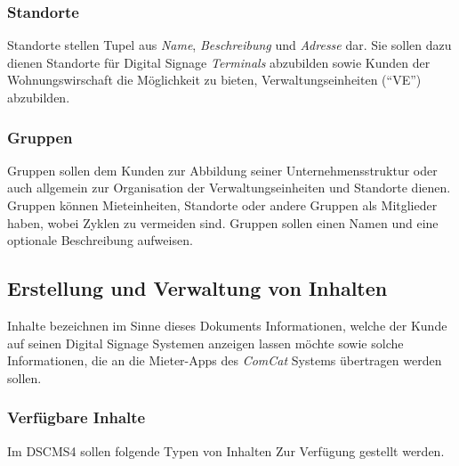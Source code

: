 \documentclass[a4paper]{article}
\begin{document}
	\subsubsection{Standorte}
	Standorte stellen Tupel aus \emph{Name}, \emph{Beschreibung} und \emph{Adresse} dar. Sie sollen dazu dienen Standorte für Digital Signage \emph{Terminals} abzubilden sowie Kunden der Wohnungswirschaft die Möglichkeit zu bieten, Verwaltungseinheiten (\enquote{VE}) abzubilden.
	\subsubsection{Gruppen}
	Gruppen sollen dem Kunden zur Abbildung seiner Unternehmensstruktur oder auch allgemein zur Organisation der Verwaltungseinheiten und Standorte dienen.
	Gruppen können Mieteinheiten, Standorte oder andere Gruppen als Mitglieder haben, wobei Zyklen zu vermeiden sind.
	Gruppen sollen einen Namen und eine optionale Beschreibung aufweisen.
	\subsection{Erstellung und Verwaltung von Inhalten}
	Inhalte bezeichnen im Sinne dieses Dokuments Informationen, welche der Kunde auf seinen Digital Signage Systemen anzeigen lassen möchte sowie solche Informationen, die an die Mieter-Apps des \emph{ComCat} Systems übertragen werden sollen.
	\subsubsection{Verfügbare Inhalte}
	Im DSCMS4 sollen folgende Typen von Inhalten Zur Verfügung gestellt werden.
\end{document}
